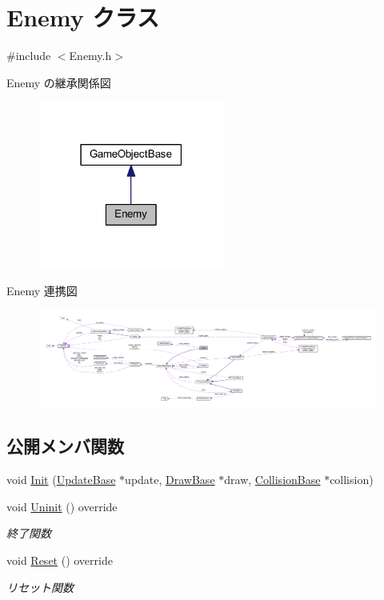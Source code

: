 \hypertarget{class_enemy}{}\section{Enemy クラス}
\label{class_enemy}


{\ttfamily \#include $<$Enemy.\+h$>$}



Enemy の継承関係図\nopagebreak
\begin{figure}[H]
\begin{center}
\leavevmode
\includegraphics[width=174pt]{class_enemy__inherit__graph}
\end{center}
\end{figure}


Enemy 連携図\nopagebreak
\begin{figure}[H]
\begin{center}
\leavevmode
\includegraphics[width=350pt]{class_enemy__coll__graph}
\end{center}
\end{figure}
\subsection*{公開メンバ関数}
\begin{DoxyCompactItemize}
\item 
void \mbox{\hyperlink{class_enemy_a678f73f8af13e1bc55be3fdad2608399}{Init}} (\mbox{\hyperlink{class_update_base}{Update\+Base}} $\ast$update, \mbox{\hyperlink{class_draw_base}{Draw\+Base}} $\ast$draw, \mbox{\hyperlink{class_collision_base}{Collision\+Base}} $\ast$collision)
\item 
void \mbox{\hyperlink{class_enemy_a9aeaa757abdf0c37fd67c4ce5aed6962}{Uninit}} () override
\begin{DoxyCompactList}\small\item\em 終了関数 \end{DoxyCompactList}\item 
void \mbox{\hyperlink{class_enemy_ab86571061e7fcabcf8c646b1abad5581}{Reset}} () override
\begin{DoxyCompactList}\small\item\em リセット関数 \end{DoxyCompactList}\end{DoxyCompactItemize}
